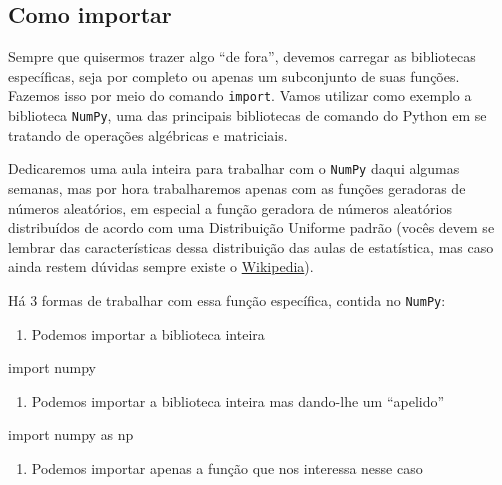 \documentclass[
  brazilian,
  letterpaper,
  DIV=11,
  numbers=noendperiod]{scrreprt}
\newenvironment{Shaded}{\begin{snugshade}}{\end{snugshade}}
\newcommand{\ImportTok}[1]{\textcolor[rgb]{0.00,0.46,0.62}{#1}}
\newcommand{\NormalTok}[1]{\textcolor[rgb]{0.00,0.23,0.31}{#1}}
\providecommand{\tightlist}{%
  \setlength{\itemsep}{0pt}\setlength{\parskip}{0pt}}
\begin{document}
\subsection{Como importar}\label{como-importar}

Sempre que quisermos trazer algo ``de fora'', devemos carregar as
bibliotecas específicas, seja por completo ou apenas um subconjunto de
suas funções. Fazemos isso por meio do comando \texttt{import}. Vamos
utilizar como exemplo a biblioteca \texttt{NumPy}, uma das principais
bibliotecas de comando do Python em se tratando de operações algébricas
e matriciais.

Dedicaremos uma aula inteira para trabalhar com o \texttt{NumPy} daqui
algumas semanas, mas por hora trabalharemos apenas com as funções
geradoras de números aleatórios, em especial a função geradora de
números aleatórios distribuídos de acordo com uma Distribuição Uniforme
padrão (vocês devem se lembrar das características dessa distribuição
das aulas de estatística, mas caso ainda restem dúvidas sempre existe o
\href{https://pt.wikipedia.org/wiki/Distribui\%C3\%A7\%C3\%A3o_uniforme}{Wikipedia}).

Há 3 formas de trabalhar com essa função específica, contida no
\texttt{NumPy}:

\begin{enumerate}
\def\labelenumi{\arabic{enumi}.}
\tightlist
\item
  Podemos importar a biblioteca inteira
\end{enumerate}

\begin{Shaded}
\begin{Highlighting}[]
\ImportTok{import}\NormalTok{ numpy}
\end{Highlighting}
\end{Shaded}

\begin{enumerate}
\def\labelenumi{\arabic{enumi}.}
\setcounter{enumi}{1}
\tightlist
\item
  Podemos importar a biblioteca inteira mas dando-lhe um ``apelido''
\end{enumerate}

\begin{Shaded}
\begin{Highlighting}[]
\ImportTok{import}\NormalTok{ numpy }\ImportTok{as}\NormalTok{ np}
\end{Highlighting}
\end{Shaded}

\begin{enumerate}
\def\labelenumi{\arabic{enumi}.}
\setcounter{enumi}{2}
\tightlist
\item
  Podemos importar apenas a função que nos interessa nesse caso
\end{enumerate}
\end{document}
